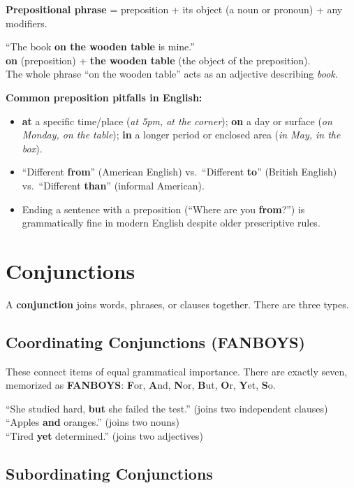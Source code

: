 \documentclass[11pt, letterpaper]{article}
\newcommand{\example}[1]{%
  \begin{tcolorbox}[colback=exbg, colframe=exborder,
    title={\bfseries Example}, arc=3pt, boxrule=1pt]
  #1
  \end{tcolorbox}%
}
\begin{document}
\textbf{Prepositional phrase} = preposition + its object (a noun or pronoun) + any modifiers.

\example{
``The book \textbf{on the wooden table} is mine.''\\
\textbf{on} (preposition) + \textbf{the wooden table} (the object of the preposition).\\
The whole phrase ``on the wooden table'' acts as an adjective describing \emph{book}.
}

\textbf{Common preposition pitfalls in English:}
\begin{itemize}[noitemsep]
  \item \textbf{at} a specific time/place (\emph{at 5pm, at the corner}); \textbf{on} a day or surface (\emph{on Monday, on the table}); \textbf{in} a longer period or enclosed area (\emph{in May, in the box}).
  \item ``Different \textbf{from}'' (American English) vs.\ ``Different \textbf{to}'' (British English) vs.\ ``Different \textbf{than}'' (informal American).
  \item Ending a sentence with a preposition (``Where are you \textbf{from}?'') is grammatically fine in modern English despite older prescriptive rules.
\end{itemize}

\section*{Conjunctions}

A \textbf{conjunction} joins words, phrases, or clauses together. There are three types.

\subsection*{Coordinating Conjunctions (FANBOYS)}

These connect items of equal grammatical importance. There are exactly seven, memorized as
\textbf{FANBOYS}: \textbf{F}or, \textbf{A}nd, \textbf{N}or, \textbf{B}ut, \textbf{O}r,
\textbf{Y}et, \textbf{S}o.

\example{
``She studied hard, \textbf{but} she failed the test.'' (joins two independent clauses)\\
``Apples \textbf{and} oranges.'' (joins two nouns)\\
``Tired \textbf{yet} determined.'' (joins two adjectives)
}

\subsection*{Subordinating Conjunctions}
\end{document}
